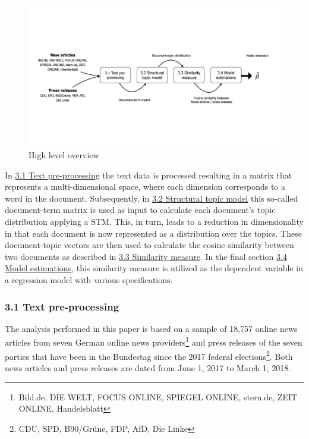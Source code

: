 \documentclass[
  12pt,
]{article}
\begin{document}
\begin{figure}
\centering
\includegraphics{../figs/high_level_overview.png}
\caption{High level overview}
\end{figure}

In \protect\hyperlink{text-pre-processing}{3.1 Text pre-processing} the
text data is processed resulting in a matrix that represents a
multi-dimensional space, where each dimension corresponds to a word in
the document. Subsequently, in
\protect\hyperlink{structural-topic-model}{3.2 Structural topic model}
this so-called document-term matrix is used as input to calculate each
document's topic distribution applying a STM. This, in turn, leads to a
reduction in dimensionality in that each document is now represented as
a distribution over the topics. These document-topic vectors are then
used to calculate the cosine similarity between two documents as
described in \protect\hyperlink{similarity-measure}{3.3 Similarity
measure}. In the final section
\protect\hyperlink{34-model-estimations}{3.4 Model estimations}, this
similarity measure is utilized as the dependent variable in a regression
model with various specifications.

\hypertarget{text-pre-processing}{%
\subsubsection{3.1 Text pre-processing}\label{text-pre-processing}}

The analysis performed in this paper is based on a sample of 18,757
online news articles from seven German online news providers\footnote{Bild.de,
  DIE WELT, FOCUS ONLINE, SPIEGEL ONLINE, stern.de, ZEIT ONLINE,
  Handelsblatt} and press releases of the seven parties that have been
in the Bundestag since the 2017 federal elections\footnote{CDU, SPD,
  B90/Grüne, FDP, AfD, Die Linke}. Both news articles and press releases
are dated from June 1, 2017 to March 1, 2018.
\end{document}
